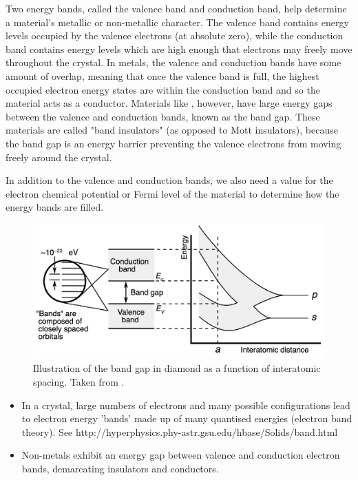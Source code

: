 Two energy bands, called the valence band and conduction band, help determine a material's metallic or non-metallic character. The valence band contains energy levels occupied by the valence electrons (at absolute zero), while the conduction band contains energy levels which are high enough that electrons may freely move throughout the crystal. In metals, the valence and conduction bands have some amount of overlap, meaning that once the valence band is full, the highest occupied electron energy states are within the conduction band and so the material acts as a conductor. Materials like \zirconia , however, have large energy gaps between the valence and conduction bands, known as the band gap. These materials are called "band insulators" (as opposed to Mott insulators), because the band gap is an energy barrier preventing the valence electrons from moving freely around the crystal.

In addition to the valence and conduction bands, we also need a value for the electron chemical potential or Fermi level of the material to determine how the energy bands are filled. 

\begin{figure}[htp]
\centering
\includegraphics[width=\linewidth]{images/band_gap.png}
\caption{Illustration of the band gap in diamond as a function of interatomic spacing. Taken from \cite{Chetvorno2017}.}
\label{figure:band_gap}
\end{figure}

\begin{itemize}
\item In a crystal, large numbers of electrons and many possible configurations lead to electron energy 'bands' made up of many quantised energies (electron band theory). See http://hyperphysics.phy-astr.gsu.edu/hbase/Solids/band.html
\item Non-metals exhibit an energy gap between valence and conduction electron bands, demarcating insulators and conductors.
\end{itemize}

